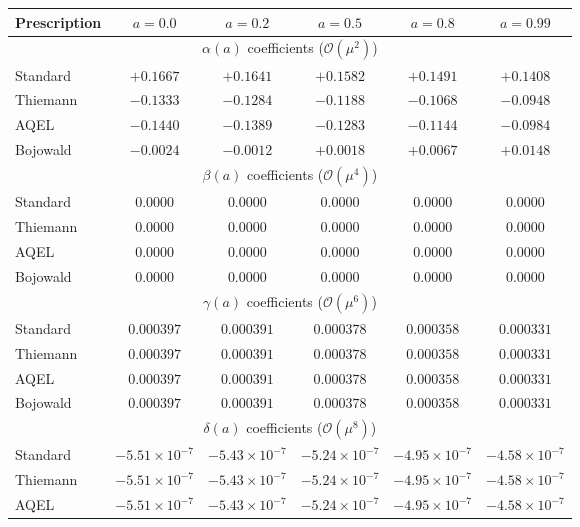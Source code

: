 \documentclass[11pt]{article}
\begin{document}
\begin{table}[h]
\centering
\begin{tabular}{|l|c|c|c|c|c|}
\hline
\textbf{Prescription} & \textbf{$a=0.0$} & \textbf{$a=0.2$} & \textbf{$a=0.5$} & \textbf{$a=0.8$} & \textbf{$a=0.99$} \\
\hline
\multicolumn{6}{|c|}{$\alpha(a)$ coefficients ($\mathcal{O}(\mu^2)$)} \\
\hline
Standard & $+0.1667$ & $+0.1641$ & $+0.1582$ & $+0.1491$ & $+0.1408$ \\
Thiemann & $-0.1333$ & $-0.1284$ & $-0.1188$ & $-0.1068$ & $-0.0948$ \\
AQEL & $-0.1440$ & $-0.1389$ & $-0.1283$ & $-0.1144$ & $-0.0984$ \\
Bojowald & $-0.0024$ & $-0.0012$ & $+0.0018$ & $+0.0067$ & $+0.0148$ \\
\hline
\multicolumn{6}{|c|}{$\beta(a)$ coefficients ($\mathcal{O}(\mu^4)$)} \\
\hline
Standard & $0.0000$ & $0.0000$ & $0.0000$ & $0.0000$ & $0.0000$ \\
Thiemann & $0.0000$ & $0.0000$ & $0.0000$ & $0.0000$ & $0.0000$ \\
AQEL & $0.0000$ & $0.0000$ & $0.0000$ & $0.0000$ & $0.0000$ \\
Bojowald & $0.0000$ & $0.0000$ & $0.0000$ & $0.0000$ & $0.0000$ \\
\hline
\multicolumn{6}{|c|}{$\gamma(a)$ coefficients ($\mathcal{O}(\mu^6)$)} \\
\hline
Standard & $0.000397$ & $0.000391$ & $0.000378$ & $0.000358$ & $0.000331$ \\
Thiemann & $0.000397$ & $0.000391$ & $0.000378$ & $0.000358$ & $0.000331$ \\
AQEL & $0.000397$ & $0.000391$ & $0.000378$ & $0.000358$ & $0.000331$ \\
Bojowald & $0.000397$ & $0.000391$ & $0.000378$ & $0.000358$ & $0.000331$ \\
\hline
\multicolumn{6}{|c|}{$\delta(a)$ coefficients ($\mathcal{O}(\mu^8)$)} \\
\hline
Standard & $-5.51 \times 10^{-7}$ & $-5.43 \times 10^{-7}$ & $-5.24 \times 10^{-7}$ & $-4.95 \times 10^{-7}$ & $-4.58 \times 10^{-7}$ \\
Thiemann & $-5.51 \times 10^{-7}$ & $-5.43 \times 10^{-7}$ & $-5.24 \times 10^{-7}$ & $-4.95 \times 10^{-7}$ & $-4.58 \times 10^{-7}$ \\
AQEL & $-5.51 \times 10^{-7}$ & $-5.43 \times 10^{-7}$ & $-5.24 \times 10^{-7}$ & $-4.95 \times 10^{-7}$ & $-4.58 \times 10^{-7}$ \\

\end{tabular}
\end{table}
\end{document}
